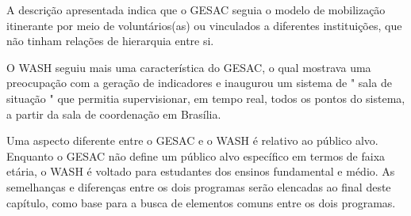 A descrição apresentada indica que o GESAC seguia o modelo de mobilização itinerante por meio de voluntários(as) ou vinculados a diferentes instituições, que não tinham relações de hierarquia entre si.

O WASH seguiu mais uma característica do GESAC, o qual  mostrava uma preocupação com a geração de indicadores e inaugurou um sistema de " sala de situação " que permitia supervisionar, em tempo real, todos os pontos do sistema, a partir da sala de coordenação em Brasília.


\noindent\begin{flushright}\mbox{\linespread{1}\selectfont\centering{}}\end{flushright}


Uma aspecto diferente entre o GESAC e o WASH é relativo ao público alvo. Enquanto o GESAC não define um público alvo específico em termos de faixa etária, o WASH é voltado para estudantes dos ensinos fundamental e médio. As semelhanças e diferenças entre os dois programas serão elencadas ao final deste capítulo, como base para a busca de elementos comuns entre os dois programas.



